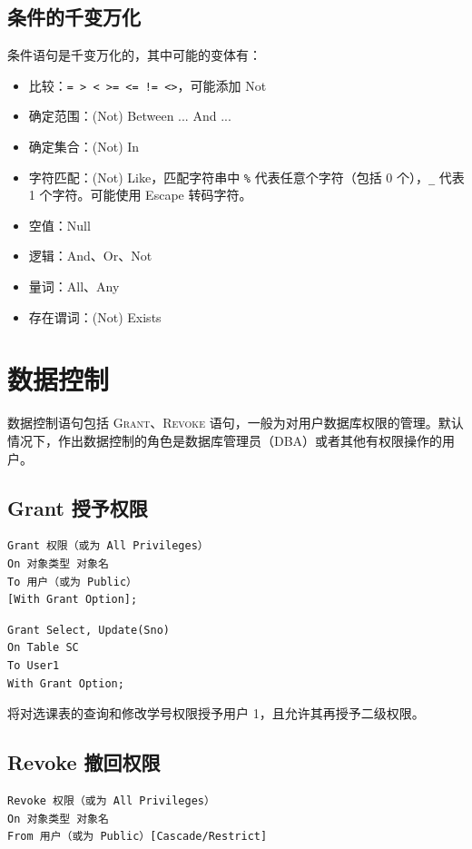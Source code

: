 \documentclass[UTF8]{ctexart}
\newcommand\kw[1]{\textsc{#1}} %
\begin{document}
\subsection{条件的千变万化}
条件语句是千变万化的，其中可能的变体有：
\begin{itemize}
    \item 比较：\verb|= > < >= <= != <>|，可能添加 Not
    \item 确定范围：(Not) Between ... And ...
    \item 确定集合：(Not) In
    \item 字符匹配：(Not) Like，匹配字符串中 \verb!%! 代表任意个字符（包括 0 个），\verb!_! 代表 1 个字符。可能使用 Escape 转码字符。
    \item 空值：Null
    \item 逻辑：And、Or、Not
    \item 量词：All、Any
    \item 存在谓词：(Not) Exists
\end{itemize}

\section{数据控制}
数据控制语句包括 \kw{Grant}、\kw{Revoke} 语句，一般为对用户数据库权限的管理。默认情况下，作出数据控制的角色是数据库管理员（DBA）或者其他有权限操作的用户。

\subsection{Grant 授予权限}
\begin{lstlisting}
Grant 权限（或为 All Privileges）
On 对象类型 对象名
To 用户（或为 Public）
[With Grant Option];
\end{lstlisting}

\begin{lstlisting}[backgroundcolor=\color{white}]
Grant Select, Update(Sno)
On Table SC
To User1
With Grant Option;
\end{lstlisting}
将对选课表的查询和修改学号权限授予用户 1，且允许其再授予二级权限。

\subsection{Revoke 撤回权限}
\begin{lstlisting}
Revoke 权限（或为 All Privileges）
On 对象类型 对象名
From 用户（或为 Public）[Cascade/Restrict]
\end{lstlisting}
\end{document}
